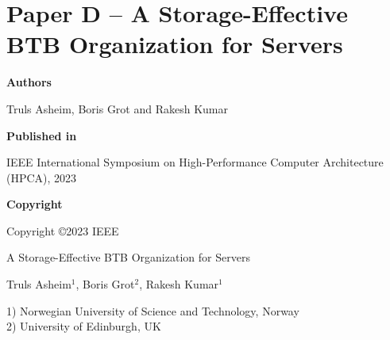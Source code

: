 \documentclass[../../../main.tex]{subfiles}
\begin{document}
\chapter{Paper D -- A Storage-Effective BTB Organization for Servers}
\label{chap:hpca-paper}

\noindent \textbf{Authors}

\vspace*{0.3cm}

\noindent Truls Asheim, Boris Grot and Rakesh Kumar

\vspace*{0.7cm}

\noindent \textbf{Published in}

\vspace*{0.3cm}

\noindent IEEE International Symposium on High-Performance Computer Architecture (HPCA), 2023

\vspace*{0.7cm}

\noindent \textbf{Copyright}

\vspace*{0.3cm}

\noindent Copyright ©2023 IEEE 


\newpage

\vspace*{0.1cm}

\begin{center}

\Huge{A Storage-Effective BTB Organization for Servers}

\vspace{0.6cm}

\large{Truls Asheim$^{1}$, Boris Grot$^{2}$, Rakesh Kumar$^{1}$}

\vspace{0.1cm}

\small{1) Norwegian University of Science and Technology, Norway}\\
\small{2) University of Edinburgh, UK}


\end{center}

\vspace{0.2cm}
\end{document}
